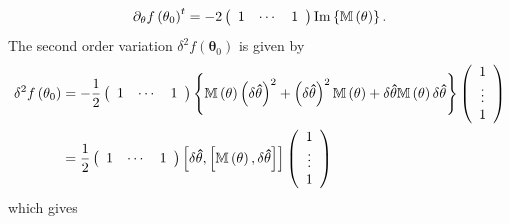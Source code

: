 \documentclass[aps,preprint]{revtex4}%
\begin{document}
\begin{equation}
\partial_{\mathbf{\theta}}f\left(  \mathbf{\theta}_{0}\right)  ^{t}=-2\left(
\begin{array}
[c]{ccc}%
1 & \cdots & 1
\end{array}
\right)  \operatorname{Im}\left\{  \mathbb{M}\left(  \mathbf{\theta}\right)
\right\}  .
\end{equation}
The second order variation $\delta^{2}f\left(  \mathbf{\theta}_{0}\right)  $
is given by
\begin{align}
\delta^{2}f\left(  \mathbf{\theta}_{0}\right)   &  =-\frac{1}{2}\left(
\begin{array}
[c]{ccc}%
1 & \cdots & 1
\end{array}
\right)  \left\{  \overset{}{\mathbb{M}\left(  \mathbf{\theta}\right)  \left(
\delta\mathbf{\hat{\theta}}\right)  ^{2}+\left(  \delta\mathbf{\hat{\theta}%
}\right)  ^{2}\mathbb{M}\left(  \mathbf{\theta}\right)  }+\delta
\mathbf{\hat{\theta}}\mathbb{M}\left(  \mathbf{\theta}\right)  \delta
\mathbf{\hat{\theta}}\right\}  \left(
\begin{array}
[c]{c}%
1\\
\vdots\\
1
\end{array}
\right)  \nonumber\\
&  =\frac{1}{2}\left(
\begin{array}
[c]{ccc}%
1 & \cdots & 1
\end{array}
\right)  \left[  \delta\mathbf{\hat{\theta},}\left[  \mathbb{M}\left(
\mathbf{\theta}\right)  ,\delta\mathbf{\hat{\theta}}\right]  \right]  \left(
\begin{array}
[c]{c}%
1\\
\vdots\\
1
\end{array}
\right)
\end{align}
which gives
\end{document}
